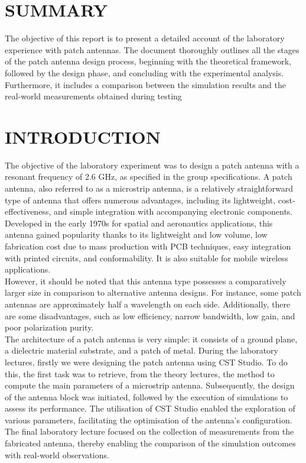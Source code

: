 \documentclass[]{article}
\begin{document}
	\section{SUMMARY}
	The objective of this report is to present a detailed account of the laboratory experience with patch antennas. The document thoroughly outlines all the stages of the patch antenna design process, beginning with the theoretical framework, followed by the design phase, and concluding with the experimental analysis. Furthermore, it includes a comparison between the simulation results and the real-world measurements obtained during testing
	\section{INTRODUCTION}
	The objective of the laboratory experiment was to design a patch antenna with a resonant frequency of 2.6 GHz, as specified in the group specifications. A patch antenna, also referred to as a microstrip antenna, is a relatively straightforward type of antenna that offers numerous advantages, including its lightweight, cost-effectiveness, and simple integration with accompanying electronic components.\\
	Developed in the early 1970s for spatial and aeronautics applications, this antenna gained popularity thanks to its lightweight and low volume, low fabrication cost due to mass production with PCB techniques, easy integration with printed circuits, and conformability. It is also suitable for mobile wireless applications.\\
	However, it should be noted that this antenna type possesses a comparatively larger size in comparison to alternative antenna designs. For instance, some patch antennas are approximately half a wavelength on each side. Additionally, there are some disadvantages, such as low efficiency, narrow bandwidth, low gain, and poor polarization purity.\\
	The architecture of a patch antenna is very simple: it consists of a ground plane, a dielectric material substrate, and a patch of metal. During the laboratory lectures, firstly we were designing the patch antenna using CST Studio. To do this, the first task was to retrieve, from the theory lectures, the method to compute the main parameters of a microstrip antenna. Subsequently, the design of the antenna block was initiated, followed by the execution of simulations to assess its performance. The utilisation of CST Studio enabled the exploration of various parameters, facilitating the optimisation of the antenna's configuration. The final laboratory lecture focused on the collection of measurements from the fabricated antenna, thereby enabling the comparison of the simulation outcomes with real-world observations.
	\newpage
\end{document}

